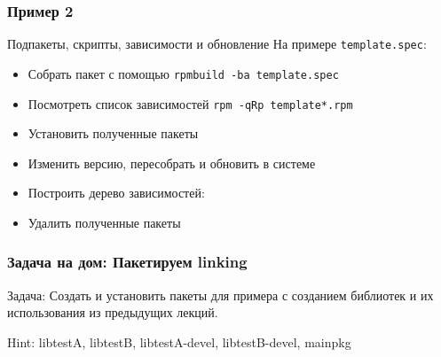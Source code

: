 \begin{frame}
	\frametitle{Пример 2}

	\begin{block}{Подпакеты, скрипты, зависимости и обновление}
		На примере {\tt template.spec}:

		\begin{itemize}
			\item Собрать пакет с помощью {\tt rpmbuild -ba template.spec}
			\item Посмотреть список зависимостей {\tt rpm -qRp template*.rpm}
			\item Установить полученные пакеты
			\item Изменить версию, пересобрать и обновить в системе
			\item Построить дерево зависимостей:
			\item Удалить полученные пакеты
		\end{itemize}
	\end{block}
\end{frame}

\begin{frame}
	\frametitle{Задача на дом: Пакетируем linking}

	\begin{block}{Задача:}
		Создать и установить пакеты для примера с созданием библиотек
		и их использования из предыдущих лекций.
	\end{block}

	Hint: libtestA, libtestB, libtestA-devel, libtestB-devel, mainpkg

\end{frame}

